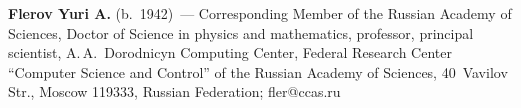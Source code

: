
\noindent
\textbf{Flerov Yuri A.} (b.\ 1942)~--- Corresponding Member of the Russian 
Academy of Sciences, Doctor of Science in physics and mathematics, professor, 
principal scientist, A.\,A.~Dorodnicyn Computing Center, Federal Research Center 
``Computer Science and Control'' of the Russian Academy of Sciences, 
40~Vavilov Str., Moscow 119333, Russian Federation; \mbox{fler@ccas.ru}

\label{end\stat}

\renewcommand{\bibname}{\protect\rm Литература}  